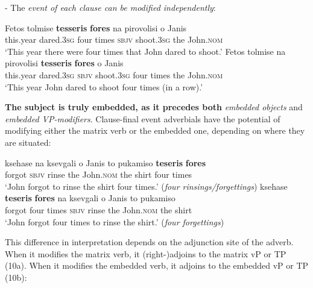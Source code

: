 \documentclass[output=paper]{langsci/langscibook}
\begin{document}
{}- The \textit{event of each clause can be modified independently}:

\ea%
    \label{ex:alexiadou:8}
\ea \gll  Fetos  tolmise     \textbf{tesseris}  \textbf{fores} na   pirovolisi  o    Janis\\
      this.year dared.\textsc{3sg}  four    times  \textsc{sbjv} shoot.\textsc{3sg}   the  John.\textsc{nom}\\
\glt  ‘This year there were four times that John dared to shoot.’ 
\ex
\gll Fetos  tolmise  na    pirovolisi  \textbf{tesseris}  \textbf{fores} o    Janis\\
     this.year  dared.\textsc{3sg}  \textsc{sbjv} shoot.\textsc{3sg}   four  times  the  John.\textsc{nom}\\
\glt ‘This year John dared to shoot four times (in a row).’
\z
\z

\textbf{The subject is truly embedded, as it precedes both} \textit{embedded objects} and \textit{embedded VP-modifiers}. Clause-final event adverbials have the potential of modifying either the matrix verb or the embedded one, depending on where they are situated:



\ea%
    \label{ex:alexiadou:9}
\ea \gll  ksehase  na    ksevgali  o    Janis       to    pukamiso  \textbf{teseris}  \textbf{fores}\\
      forgot   \textsc{sbjv} rinse   the  John.\textsc{nom} the  shirt        four     times\\
  \glt    ‘John forgot to rinse the shirt four times.’ (\textit{four rinsings/forgettings})
\ex  \gll  ksehase  \textbf{teseris}  \textbf{fores} na  ksevgali  o    Janis      to  pukamiso\\
      forgot  four   times  \textsc{sbjv}  rinse  the  John.\textsc{nom} the  shirt\\
   \glt   ‘John forgot four times to rinse the shirt.’ (\textit{four forgettings})
   \z   
\z

This difference in interpretation depends on the adjunction site of the adverb. When it modifies the matrix verb, it (right-)adjoins to the matrix vP or TP (10a). When it modifies the embedded verb, it adjoins to the embedded vP or TP (10b):
\end{document}
